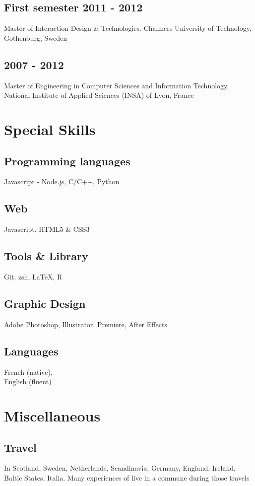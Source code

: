  \subsection{First semester 2011 - 2012}
  	{Master of Interaction Design \& Technologies. Chalmers University of Technology, Gothenburg, Sweden}

	\subsection{2007 - 2012}
		{Master of Engineering in Computer Sciences and Information Technology, National Institute of Applied Sciences (INSA) of Lyon, France}

\eject

\section{Special Skills}
	\subsection{Programming languages}
		{Javascript - Node.js, C/C++, Python}
		
	\subsection{Web}
		{Javascript, HTML5 \& CSS3}

	\subsection{Tools \& Library}
	  {Git, zsh, \LaTeX, R}
		
	\subsection{Graphic Design}
		{Adobe Photoshop, Illustrator, Premiere, After Effects}

	\subsection{Languages}
		{French (native),\\English (fluent)}
				
\section{Miscellaneous}
	\subsection{Travel}
		{In Scotland, Sweden, Netherlands, Scandinavia, Germany, England, Ireland, Baltic States, Italia. Many experiences of live in a commune during those travels}
		
